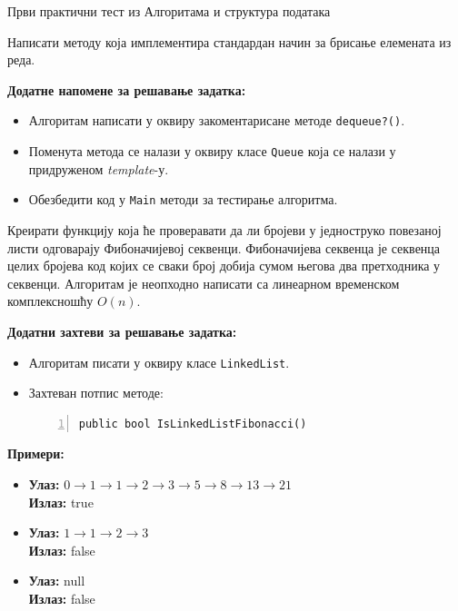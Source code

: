 
Први практични тест из Алгоритама и структура података

Написати методу која имплементира стандардан начин за брисање елемената из реда.

\textbf{Додатне напомене за решавање задатка:}
\begin{itemize}
    \item Алгоритам написати у оквиру закоментарисане методе \texttt{dequeue?()}.
    \item Поменута метода се налази у оквиру класе \texttt{Queue} која се налази у придруженом \textit{template}-у.
    \item Обезбедити код у \texttt{Main} методи за тестирање алгоритма.
\end{itemize}



Креирати функцију која ће проверавати да ли бројеви у једноструко повезаној листи одговарају Фибоначијевој секвенци. Фибоначијева секвенца је секвенца целих бројева код којих се сваки број добија сумом његова два претходника у секвенци. Алгоритам је неопходно написати са линеарном временском комплексношћу $O(n)$.

\textbf{Додатни захтеви за решавање задатка:}
\begin{itemize}
    \item Алгоритам писати у оквиру класе \texttt{LinkedList}.
    \item Захтеван потпис методе:
    \begin{Verbatim}[fontsize=\footnotesize, numbers=left, xleftmargin=10mm]
public bool IsLinkedListFibonacci()
    \end{Verbatim}
\end{itemize}

\textbf{Примери:}
\begin{itemize}
    \item \textbf{Улаз:} $0 \rightarrow 1 \rightarrow 1 \rightarrow 2 \rightarrow 3 \rightarrow 5 \rightarrow 8 \rightarrow 13 \rightarrow 21$ \\
          \textbf{Излаз:} true
    \item \textbf{Улаз:} $1 \rightarrow 1 \rightarrow 2 \rightarrow 3$ \\
          \textbf{Излаз:} false
    \item \textbf{Улаз:} null \\
          \textbf{Излаз:} false
\end{itemize}



